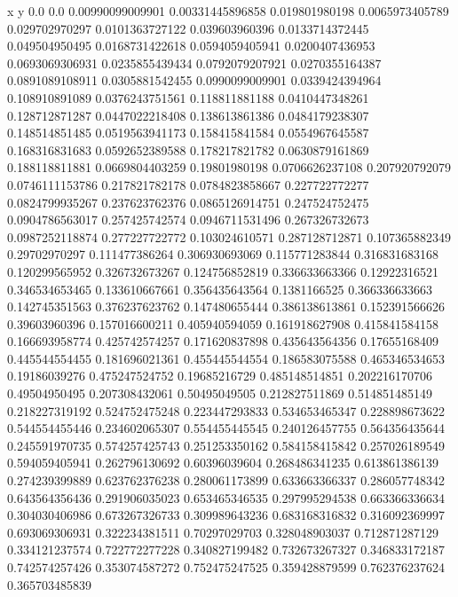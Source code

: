               x                y
            0.0              0.0
0.00990099009901  0.00331445896858
 0.019801980198  0.0065973405789
 0.029702970297  0.0101363727122
 0.039603960396  0.0133714372445
 0.049504950495  0.0168731422618
0.0594059405941  0.0200407436953
0.0693069306931  0.0235855439434
0.0792079207921  0.0270355164387
0.0891089108911  0.0305881542455
0.0990099009901  0.0339424394964
 0.108910891089  0.0376243751561
 0.118811881188  0.0410447348261
 0.128712871287  0.0447022218408
 0.138613861386  0.0484179238307
 0.148514851485  0.0519563941173
 0.158415841584  0.0554967645587
 0.168316831683  0.0592652389588
 0.178217821782  0.0630879161869
 0.188118811881  0.0669804403259
  0.19801980198  0.0706626237108
 0.207920792079  0.0746111153786
 0.217821782178  0.0784823858667
 0.227722772277  0.0824799935267
 0.237623762376  0.0865126914751
 0.247524752475  0.0904786563017
 0.257425742574  0.0946711531496
 0.267326732673  0.0987252118874
 0.277227722772   0.103024610571
 0.287128712871   0.107365882349
  0.29702970297   0.111477386264
 0.306930693069   0.115771283844
 0.316831683168   0.120299565952
 0.326732673267   0.124756852819
 0.336633663366    0.12922316521
 0.346534653465   0.133610667661
 0.356435643564     0.1381166525
 0.366336633663   0.142745351563
 0.376237623762   0.147480655444
 0.386138613861   0.152391566626
  0.39603960396   0.157016600211
 0.405940594059   0.161918627908
 0.415841584158   0.166693958774
 0.425742574257   0.171620837898
 0.435643564356    0.17655168409
 0.445544554455   0.181696021361
 0.455445544554   0.186583075588
 0.465346534653    0.19186039276
 0.475247524752    0.19685216729
 0.485148514851   0.202216170706
  0.49504950495   0.207308432061
  0.50495049505   0.212827511869
 0.514851485149   0.218227319192
 0.524752475248   0.223447293833
 0.534653465347   0.228898673622
 0.544554455446   0.234602065307
 0.554455445545   0.240126457755
 0.564356435644   0.245591970735
 0.574257425743   0.251253350162
 0.584158415842   0.257026189549
 0.594059405941   0.262796130692
  0.60396039604   0.268486341235
 0.613861386139   0.274239399889
 0.623762376238   0.280061173899
 0.633663366337   0.286057748342
 0.643564356436   0.291906035023
 0.653465346535   0.297995294538
 0.663366336634   0.304030406986
 0.673267326733   0.309989643236
 0.683168316832   0.316092369997
 0.693069306931   0.322234381511
  0.70297029703   0.328048903037
 0.712871287129   0.334121237574
 0.722772277228   0.340827199482
 0.732673267327   0.346833172187
 0.742574257426   0.353074587272
 0.752475247525   0.359428879599
 0.762376237624   0.365703485839
